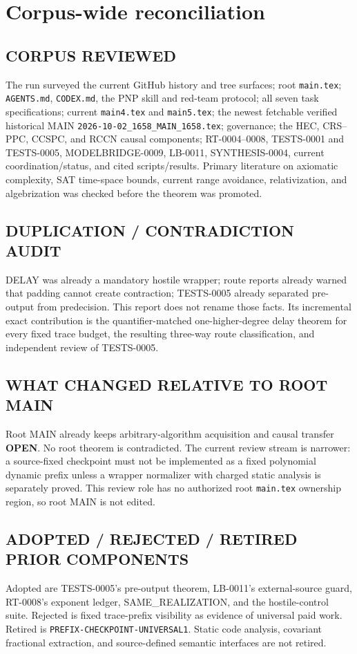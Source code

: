 \documentclass[11pt]{article}
\newcommand{\OPEN}{\textbf{OPEN}}
\begin{document}
\section{Corpus-wide reconciliation}

\subsection*{CORPUS REVIEWED}
The run surveyed the current GitHub history and tree surfaces; root
\texttt{main.tex}; \texttt{AGENTS.md}, \texttt{CODEX.md}, the PNP skill and
red-team protocol; all seven task specifications; current \texttt{main4.tex}
and \texttt{main5.tex}; the newest fetchable verified historical MAIN
\texttt{2026-10-02\_1658\_MAIN\_1658.tex}; governance; the HEC, CRS--PPC,
CCSPC, and RCCN causal components; RT-0004--0008, TESTS-0001 and TESTS-0005,
MODELBRIDGE-0009, LB-0011, SYNTHESIS-0004, current coordination/status, and
cited scripts/results.  Primary literature on axiomatic complexity, SAT
time-space bounds, current range avoidance, relativization, and algebrization
was checked before the theorem was promoted.

\subsection*{DUPLICATION / CONTRADICTION AUDIT}
DELAY was already a mandatory hostile wrapper; route reports already warned
that padding cannot create contraction; TESTS-0005 already separated
pre-output from predecision.  This report does not rename those facts.  Its
incremental exact contribution is the quantifier-matched one-higher-degree
delay theorem for every fixed trace budget, the resulting three-way route
classification, and independent review of TESTS-0005.

\subsection*{WHAT CHANGED RELATIVE TO ROOT MAIN}
Root MAIN already keeps arbitrary-algorithm acquisition and causal transfer
\OPEN.  No root theorem is contradicted.  The current review stream is
narrower: a source-fixed checkpoint must not be implemented as a fixed
polynomial dynamic prefix unless a wrapper normalizer with charged static
analysis is separately proved.  This review role has no authorized root
\texttt{main.tex} ownership region, so root MAIN is not edited.

\subsection*{ADOPTED / REJECTED / RETIRED PRIOR COMPONENTS}
Adopted are TESTS-0005's pre-output theorem, LB-0011's external-source guard,
RT-0008's exponent ledger, SAME\_REALIZATION, and the hostile-control suite.
Rejected is fixed trace-prefix visibility as evidence of universal paid work.
Retired is \texttt{PREFIX-CHECKPOINT-UNIVERSAL1}.  Static code analysis,
covariant fractional extraction, and source-defined semantic interfaces are
not retired.
\end{document}

